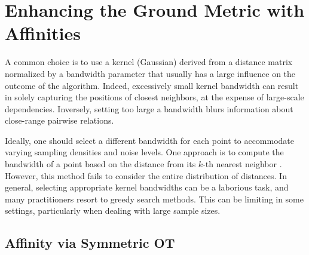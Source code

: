\section{Enhancing the Ground Metric with Affinities}


A common choice is to use a kernel (\eg Gaussian) derived from a distance matrix normalized by a bandwidth parameter that usually has a large influence on the outcome of the algorithm. 
Indeed, excessively small kernel bandwidth can result in %
solely capturing the positions of closest neighbors, at the expense of large-scale dependencies. Inversely, setting too large a bandwidth blurs information about close-range pairwise relations. 

Ideally, one should select a different bandwidth for each point to accommodate varying sampling densities and noise levels. One approach is to compute the bandwidth of a point based on the distance from its $k$-th nearest neighbor \citep{zelnik2004self}. However, this method fails to consider the entire distribution of distances.
In general, selecting appropriate kernel bandwidths can be a laborious task, and many practitioners resort to greedy search methods. This can be limiting in some settings, particularly when dealing with large sample sizes.

\subsection{Affinity via Symmetric OT}\label{sec:affinity_sym_ot}

